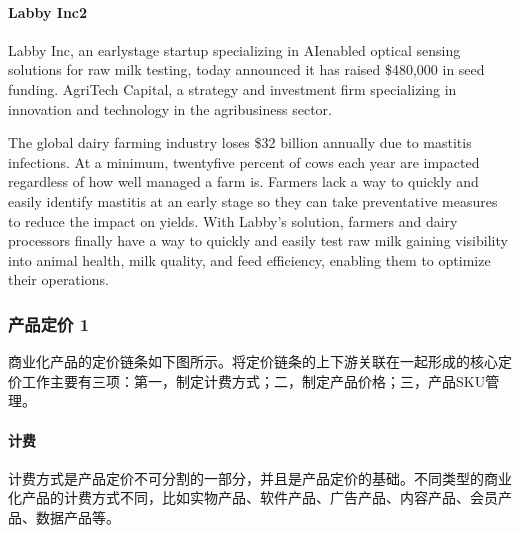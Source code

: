 \documentclass[letterpaper,11pt,english]{sphinxmanual}
\begin{document}
\paragraph{Labby Inc2\sphinxfootnotemark[594]}
\label{\detokenize{chapter_knowledge/Valuation:labby-inc2}}%
\begin{footnotetext}[594]\sphinxAtStartFootnote
{}
%
\end{footnotetext}\ignorespaces 
Labby Inc, an early\sphinxhyphen{}stage startup specializing in AI\sphinxhyphen{}enabled optical
sensing solutions for raw milk testing, today announced it has raised
\$480,000 in seed funding. AgriTech Capital, a strategy and investment
firm specializing in innovation and technology in the agribusiness
sector.

The global dairy farming industry loses \$32 billion annually due to
mastitis infections. At a minimum, twenty\sphinxhyphen{}five percent of cows each year
are impacted regardless of how well managed a farm is. Farmers lack a
way to quickly and easily identify mastitis at an early stage so they
can take preventative measures to reduce the impact on yields. With
Labby’s solution, farmers and dairy processors finally have a way to
quickly and easily test raw milk gaining visibility into animal health,
milk quality, and feed efficiency, enabling them to optimize their
operations.


\subsubsection{产品定价 1\sphinxfootnotemark[595]}
\label{\detokenize{chapter_knowledge/price:id1}}\label{\detokenize{chapter_knowledge/price::doc}}%
\begin{footnotetext}[595]\sphinxAtStartFootnote
{}
%
\end{footnotetext}\ignorespaces 
商业化产品的定价链条如下图所示。将定价链条的上下游关联在一起形成的核心定价工作主要有三项：第一，制定计费方式；二，制定产品价格；三，产品SKU管理。


\paragraph{计费}
\label{\detokenize{chapter_knowledge/price:id2}}
计费方式是产品定价不可分割的一部分，并且是产品定价的基础。不同类型的商业化产品的计费方式不同，比如实物产品、软件产品、广告产品、内容产品、会员产品、数据产品等。
\end{document}
